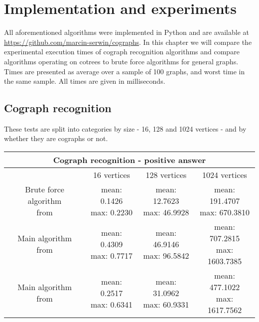 \section{Implementation and experiments}

All aforementioned algorithms were implemented in Python and are available at \url{https://github.com/marcin-serwin/cographs}. In this chapter we will compare the experimental execution times of cograph recognition algorithms and compare algorithms operating on cotrees to brute force algorithms for general graphs. Times are presented as average over a sample of 100 graphs, and worst time in the same sample. All times are given in milliseconds.

\subsection{Cograph recognition}
These tests are split into categories by size - 16, 128 and 1024 vertices - and by whether they are cographs or not.

\begin{center}

    \begin{tabular}{ |c|c|c|c|}
        \hline
        \multicolumn{4}{|c|}{Cograph recognition - positive answer} \\
        \hline
         & 16 vertices & 128 vertices & 1024 vertices               \\
        \hline
        \makecell{Brute force algorithm                             \\ from \cite{habib}} & \makecell{mean: 0.1426                                \\ max: 0.2230} & \makecell{mean: 12.7623 \\ max: 46.9928} & \makecell{mean: 191.4707 \\ max: 670.3810} \\
        \hline
        \makecell{Main algorithm                                    \\ from \cite{habib}} & \makecell{mean: 0.4309                                \\ max: 0.7717} & \makecell{mean: 46.9146 \\ max: 96.5842} & \makecell{mean: 707.2815 \\ max: 1603.7385} \\
        \hline
        \makecell{Main algorithm                                    \\ from \cite{corneil}} & \makecell{mean: 0.2517                                \\ max: 0.6341} & \makecell{mean: 31.0962 \\ max: 60.9331} & \makecell{mean: 477.1022 \\ max: 1617.7562} \\
        \hline
    \end{tabular}
\end{center}

